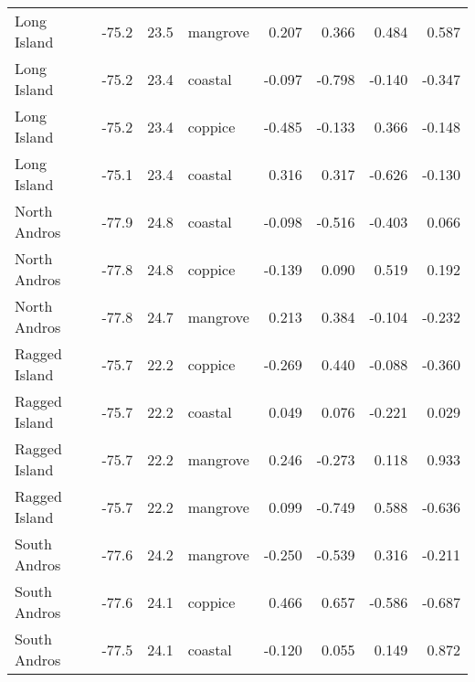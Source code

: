 \begin{tabular}{lrrlrrrr}
Long Island & -75.2 & 23.5 & mangrove & 0.207 & 0.366 & 0.484 & 0.587\\
Long Island & -75.2 & 23.4 & coastal & -0.097 & -0.798 & -0.140 & -0.347\\
Long Island & -75.2 & 23.4 & coppice & -0.485 & -0.133 & 0.366 & -0.148\\
Long Island & -75.1 & 23.4 & coastal & 0.316 & 0.317 & -0.626 & -0.130\\
North Andros & -77.9 & 24.8 & coastal & -0.098 & -0.516 & -0.403 & 0.066\\
North Andros & -77.8 & 24.8 & coppice & -0.139 & 0.090 & 0.519 & 0.192\\
North Andros & -77.8 & 24.7 & mangrove & 0.213 & 0.384 & -0.104 & -0.232\\
Ragged Island & -75.7 & 22.2 & coppice & -0.269 & 0.440 & -0.088 & -0.360\\
Ragged Island & -75.7 & 22.2 & coastal & 0.049 & 0.076 & -0.221 & 0.029\\
Ragged Island & -75.7 & 22.2 & mangrove & 0.246 & -0.273 & 0.118 & 0.933\\
Ragged Island & -75.7 & 22.2 & mangrove & 0.099 & -0.749 & 0.588 & -0.636\\
South Andros & -77.6 & 24.2 & mangrove & -0.250 & -0.539 & 0.316 & -0.211\\
South Andros & -77.6 & 24.1 & coppice & 0.466 & 0.657 & -0.586 & -0.687\\
South Andros & -77.5 & 24.1 & coastal & -0.120 & 0.055 & 0.149 & 0.872\\
\bottomrule
\end{tabular}